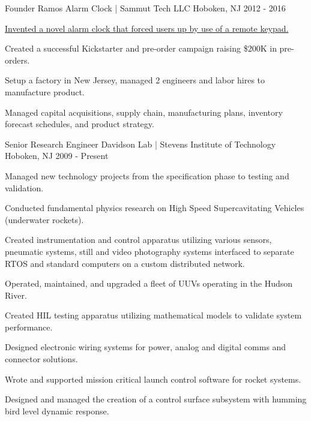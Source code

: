 \begin{cventries}
  \cventry
    {Founder} %
    {Ramos Alarm Clock | Sammut Tech LLC} %
    {Hoboken, NJ} %
    {2012 - 2016} %
    {
      \begin{cvitems} %
        \item {\href{http://bit.ly/2NvLgHA}{Invented a novel alarm clock that forced users up by use of a remote keypad.}}
        \item {Created a successful Kickstarter and pre-order campaign raising \$200K in pre-orders.}
        \item {Setup a factory in New Jersey, managed 2 engineers and labor hires to manufacture product.}
        \item {Managed capital acquisitions, supply chain, manufacturing plans, inventory forecast schedules, and product strategy.}
      \end{cvitems}
    }

  \cventry
    {Senior Research Engineer} %
    {Davidson Lab | Stevens Institute of Technology} %
    {Hoboken, NJ} %
    {2009 - Present} %
    {
      \begin{cvitems} %
        \item {Managed new technology projects from the specification phase to testing and validation.} 
        \item {Conducted fundamental physics research on High Speed Supercavitating Vehicles (underwater rockets).}
        \item {Created instrumentation and control apparatus utilizing various sensors, pneumatic systems, still and video photography systems
            interfaced to separate RTOS and standard computers on a custom distributed network.} 
        \item {Operated, maintained, and upgraded a fleet of UUVs operating in the Hudson River.}
        \item {Created HIL testing apparatus utilizing mathematical models to validate system performance.} 
        \item {Designed electronic wiring systems for power, analog and digital comms and connector solutions.}
        \item {Wrote and supported mission critical launch control software for rocket systems.} 
        \item {Designed and managed the creation of a control surface subsystem with humming bird level dynamic response.}
      \end{cvitems}
    }


\end{cventries}
